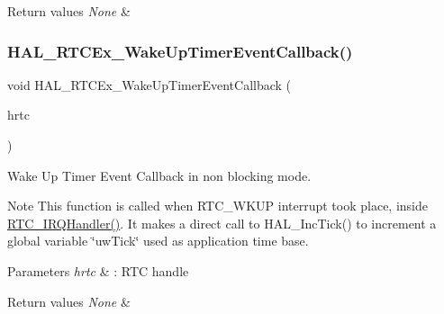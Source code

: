 \begin{DoxyRetVals}{Return values}
{\em None} & \\
\hline
\end{DoxyRetVals}
\mbox{\label{group___h_a_l___time_base___r_t_c___wake_up___template_gac9ed5d6224b5c86f2845a9c1af7d94de}} 
\subsubsection{\texorpdfstring{H\+A\+L\+\_\+\+R\+T\+C\+Ex\+\_\+\+Wake\+Up\+Timer\+Event\+Callback()}{HAL\_RTCEx\_WakeUpTimerEventCallback()}}
{\footnotesize\ttfamily void H\+A\+L\+\_\+\+R\+T\+C\+Ex\+\_\+\+Wake\+Up\+Timer\+Event\+Callback (\begin{DoxyParamCaption}\item[{\hyperlink{struct_r_t_c___handle_type_def}{R\+T\+C\+\_\+\+Handle\+Type\+Def} $\ast$}]{hrtc }\end{DoxyParamCaption})}



Wake Up Timer Event Callback in non blocking mode. 

\begin{DoxyNote}{Note}
This function is called when R\+T\+C\+\_\+\+W\+K\+UP interrupt took place, inside \hyperlink{group___h_a_l___time_base___r_t_c___wake_up___template_gab86b9dd0d7b4eacfe38086e1fa4c2312}{R\+T\+C\+\_\+\+I\+R\+Q\+Handler()}. It makes a direct call to H\+A\+L\+\_\+\+Inc\+Tick() to increment a global variable \char`\"{}uw\+Tick\char`\"{} used as application time base. 
\end{DoxyNote}

\begin{DoxyParams}{Parameters}
{\em hrtc} & \+: R\+TC handle \\
\hline
\end{DoxyParams}

\begin{DoxyRetVals}{Return values}
{\em None} & \\
\hline
\end{DoxyRetVals}
\mbox{\label{group___h_a_l___time_base___r_t_c___wake_up___template_gaaf651af2afe688a991c657f64f8fa5f9}} 
